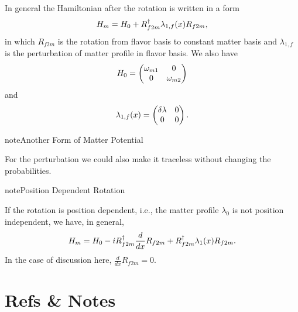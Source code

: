 \documentclass[letterpaper,12pt,english]{sphinxmanual}
\begin{document}
In general the Hamiltonian after the rotation is written in a form
\begin{gather}
\begin{split}H_m = H_0 + R_{f2m}^\dagger \lambda_{1,f}(x) R_{f2m},\end{split}\notag
\end{gather}
in which \(R_{f2m}\) is the rotation from flavor basis to constant matter basis and \(\lambda_{1,f}\) is the perturbation of matter profile in flavor basis. We also have
\begin{gather}
\begin{split}H_0 = \begin{pmatrix} \omega_{m1} & 0 \\ 0 & \omega_{m2} \end{pmatrix}\end{split}\notag
\end{gather}
and
\begin{gather}
\begin{split}\lambda_{1,f}(x) = \begin{pmatrix} \delta\lambda & 0 \\ 0 & 0  \end{pmatrix}.\end{split}\notag
\end{gather}
\begin{notice}{note}{Another Form of Matter Potential}

For the perturbation we could also make it traceless without changing the probabilities.
\end{notice}

\begin{notice}{note}{Position Dependent Rotation}

If the rotation is position dependent, i.e., the matter profile \(\lambda_0\) is not position independent, we have, in general,
\begin{gather}
\begin{split}H_m = H_0 - i R_{f2m}^\dagger \frac{d}{dx} R_{f2m} + R_{f2m}^\dagger \lambda_1(x) R_{f2m}.\end{split}\notag
\end{gather}
In the case of discussion here, \(\frac{d}{dx} R_{f2m}=0\).
\end{notice}


\section{Refs \& Notes}
\label{basis:refs-notes}
\end{document}
